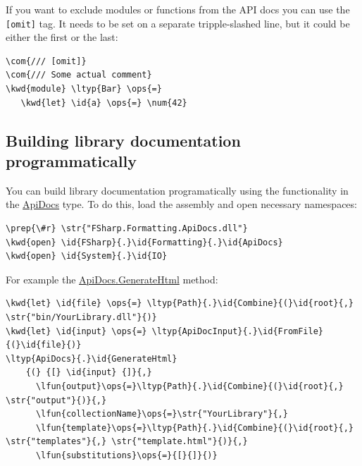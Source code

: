 \documentclass{article}
\newcommand{\id}[1]{\textcolor{black}{#1}}
\newcommand{\com}[1]{\textcolor{officegreen}{#1}}
\newcommand{\kwd}[1]{\textcolor{navy}{#1}}
\newcommand{\num}[1]{\textcolor{officegreen}{#1}}
\newcommand{\ops}[1]{\textcolor{purple}{#1}}
\newcommand{\prep}[1]{\textcolor{purple}{#1}}
\newcommand{\str}[1]{\textcolor{olive}{#1}}
\begin{document}
If you want to exclude modules or functions from the API docs you can use the \texttt{[omit]} tag.
It needs to be set on a separate tripple-slashed line, but it could be either the first or the last:
\begin{Verbatim}[commandchars=\\\{\}]
\com{/// [omit]}
\com{/// Some actual comment}
\kwd{module} \ltyp{Bar} \ops{=} 
   \kwd{let} \id{a} \ops{=} \num{42}
\end{Verbatim}

\subsection*{Building library documentation programmatically}



You can build library documentation programatically using the functionality
in the \href{https://fsprojects.github.io/FSharp.Formatting/reference/fsharp-formatting-apidocs-apidocs.html}{ApiDocs} type. To do this, load the assembly and open necessary namespaces:
\begin{Verbatim}[commandchars=\\\{\}]
\prep{\#r} \str{"FSharp.Formatting.ApiDocs.dll"}
\kwd{open} \id{FSharp}{.}\id{Formatting}{.}\id{ApiDocs}
\kwd{open} \id{System}{.}\id{IO}
\end{Verbatim}



For example the \href{https://fsprojects.github.io/FSharp.Formatting/reference/fsharp-formatting-apidocs-apidocs.html}{ApiDocs.GenerateHtml} method:
\begin{Verbatim}[commandchars=\\\{\}]
\kwd{let} \id{file} \ops{=} \ltyp{Path}{.}\id{Combine}{(}\id{root}{,} \str{"bin/YourLibrary.dll"}{)}
\kwd{let} \id{input} \ops{=} \ltyp{ApiDocInput}{.}\id{FromFile}{(}\id{file}{)} 
\ltyp{ApiDocs}{.}\id{GenerateHtml}
    {(} {[} \id{input} {]}{,} 
      \lfun{output}\ops{=}\ltyp{Path}{.}\id{Combine}{(}\id{root}{,} \str{"output"}{)}{,}
      \lfun{collectionName}\ops{=}\str{"YourLibrary"}{,}
      \lfun{template}\ops{=}\ltyp{Path}{.}\id{Combine}{(}\id{root}{,} \str{"templates"}{,} \str{"template.html"}{)}{,}
      \lfun{substitutions}\ops{=}{[}{]}{)}
\end{Verbatim}
\end{document}
